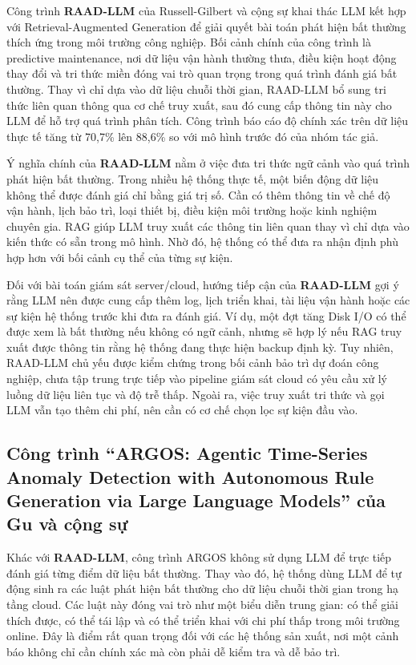 Công trình \textbf{RAAD-LLM} của Russell-Gilbert và cộng sự khai thác LLM kết hợp với Retrieval-Augmented Generation để giải quyết bài toán phát hiện bất thường thích ứng trong môi trường công nghiệp. Bối cảnh chính của công trình là predictive maintenance, nơi dữ liệu vận hành thường thưa, điều kiện hoạt động thay đổi và tri thức miền đóng vai trò quan trọng trong quá trình đánh giá bất thường. Thay vì chỉ dựa vào dữ liệu chuỗi thời gian, RAAD-LLM bổ sung tri thức liên quan thông qua cơ chế truy xuất, sau đó cung cấp thông tin này cho LLM để hỗ trợ quá trình phân tích. Công trình báo cáo độ chính xác trên dữ liệu thực tế tăng từ 70,7\% lên 88,6\% so với mô hình trước đó của nhóm tác giả.

Ý nghĩa chính của \textbf{RAAD-LLM} nằm ở việc đưa tri thức ngữ cảnh vào quá trình phát hiện bất thường. Trong nhiều hệ thống thực tế, một biến động dữ liệu không thể được đánh giá chỉ bằng giá trị số. Cần có thêm thông tin về chế độ vận hành, lịch bảo trì, loại thiết bị, điều kiện môi trường hoặc kinh nghiệm chuyên gia. RAG giúp LLM truy xuất các thông tin liên quan thay vì chỉ dựa vào kiến thức có sẵn trong mô hình. Nhờ đó, hệ thống có thể đưa ra nhận định phù hợp hơn với bối cảnh cụ thể của từng sự kiện.

Đối với bài toán giám sát server/cloud, hướng tiếp cận của \textbf{RAAD-LLM} gợi ý rằng LLM nên được cung cấp thêm log, lịch triển khai, tài liệu vận hành hoặc các sự kiện hệ thống trước khi đưa ra đánh giá. Ví dụ, một đợt tăng Disk I/O có thể được xem là bất thường nếu không có ngữ cảnh, nhưng sẽ hợp lý nếu RAG truy xuất được thông tin rằng hệ thống đang thực hiện backup định kỳ. Tuy nhiên, RAAD-LLM chủ yếu được kiểm chứng trong bối cảnh bảo trì dự đoán công nghiệp, chưa tập trung trực tiếp vào pipeline giám sát cloud có yêu cầu xử lý luồng dữ liệu liên tục và độ trễ thấp. Ngoài ra, việc truy xuất tri thức và gọi LLM vẫn tạo thêm chi phí, nên cần có cơ chế chọn lọc sự kiện đầu vào.

\subsection*{Công trình “ARGOS: Agentic Time-Series Anomaly Detection with Autonomous Rule Generation via Large Language Models” của Gu và cộng sự}

Khác với \textbf{RAAD-LLM}, công trình ARGOS không sử dụng LLM để trực tiếp đánh giá từng điểm dữ liệu bất thường. Thay vào đó, hệ thống dùng LLM để tự động sinh ra các luật phát hiện bất thường cho dữ liệu chuỗi thời gian trong hạ tầng cloud. Các luật này đóng vai trò như một biểu diễn trung gian: có thể giải thích được, có thể tái lập và có thể triển khai với chi phí thấp trong môi trường online. Đây là điểm rất quan trọng đối với các hệ thống sản xuất, nơi một cảnh báo không chỉ cần chính xác mà còn phải dễ kiểm tra và dễ bảo trì.

